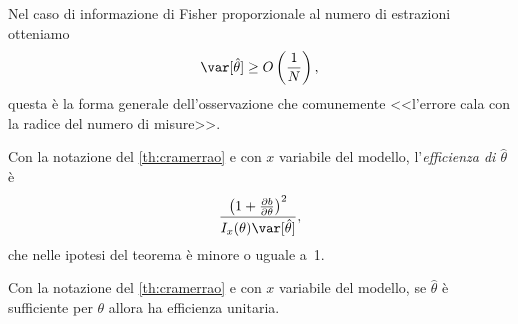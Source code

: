 Nel caso di informazione di Fisher proporzionale al numero di estrazioni otteniamo
\begin{equation*}
	\var[\hat\theta] \ge O \left(\frac1N\right),
\end{equation*}
questa è la forma generale dell'osservazione che comunemente
<<l'errore cala con la radice del numero di misure>>.

\begin{definition}[Efficienza]
	Con la notazione del \autoref{th:cramerrao} e con $x$ variabile del modello,
	l'\emph{efficienza di $\hat\theta$} è
	\begin{equation*}
		\frac{\left( 1 + \frac{\partial b}{\partial\theta} \right)^2}{I_x(\theta)\var[\hat\theta]},
	\end{equation*}
	che nelle ipotesi del teorema è minore o uguale a~1.
\end{definition}

\begin{theorem}
	Con la notazione del \autoref{th:cramerrao} e con $x$ variabile del modello,
	se $\hat\theta$ è sufficiente per $\theta$ allora ha efficienza unitaria.
\end{theorem}

